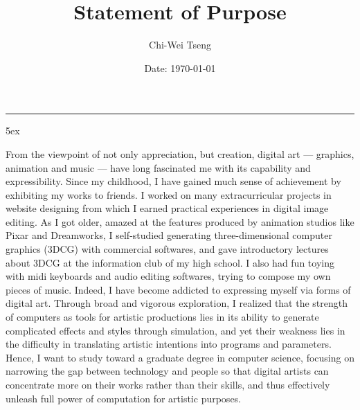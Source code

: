 \documentclass[a4paper, 12pt]{article}
\title{Statement of Purpose}
\author{Chi-Wei Tseng}
\date{Date: \today}
\makeatletter
\newcommand{\HRule}{\rule{\linewidth}{0.2mm}}
\renewcommand{\maketitle}{
  \parindent=0pt%
  \begin{flushleft}
  \bf \large{\@author}
  \HRule
  \end{flushleft}
  \begin{center}
    \MakeUppercase{\bf \@title}
  \end{center}%
    \par
}
\makeatother
\begin{document}
{\linespread{0.8} \maketitle}
\parindent 5ex

From the viewpoint of not only appreciation, but creation, digital art --- graphics, animation and music --- have long fascinated me with its capability and expressibility. Since my childhood, I have gained much sense of achievement by exhibiting my works to friends. I worked on many extracurricular projects in website designing from which I earned practical experiences in digital image editing. As I got older, amazed at the features produced by animation studios like Pixar and Dreamworks, I self-studied generating three-dimensional computer graphics (3DCG) with commercial softwares, and gave introductory lectures about 3DCG at the information club of my high school. I also had fun toying with midi keyboards and audio editing softwares, trying to compose my own pieces of music. Indeed, I have become addicted to expressing myself via forms of digital art. Through broad and vigorous exploration, I realized that the strength of computers as tools for artistic productions lies in its ability to generate complicated effects and styles through simulation, and yet their weakness lies in the difficulty in translating artistic intentions into programs and parameters. Hence, I want to study toward a graduate degree in computer science, focusing on narrowing the gap between technology and people so that digital artists can concentrate more on their works rather than their skills, and thus effectively unleash full power of computation for artistic purposes.\\

\end{document}

